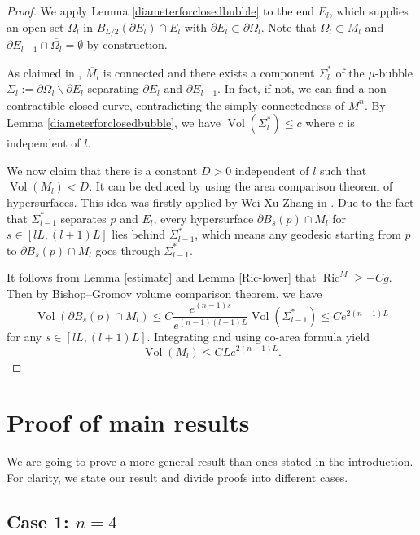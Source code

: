 \documentclass[11pt,letterpaper]{amsart}
\DeclareMathOperator{\Vol}{Vol}
\DeclareMathOperator{\Ric}{Ric}
\newtheorem{theorem}{Theorem}[section]
\theoremstyle{definition}
\theoremstyle{remark}
\numberwithin{equation}{section}
\begin{document}
\begin{proof}
We apply Lemma \ref{diameterforclosedbubble} to the end $E_l$, which supplies an open set $\Omega_l$ in $B_{L/2}(\partial E_l)\cap E_l$ with $\partial E_l\subset \partial \Omega_l$. Note that $\Omega_l\subset M_l$ and $\partial E_{l+1}\cap \overline{\Omega_l}=\emptyset$ by construction. 

As claimed in \cite[Lemma 5.4]{chodosh-li-stryker}, $\overline{M_l}$ is connected and there exists a component $\Sigma^{*}_l$ of the $\mu$-bubble $\Sigma_l:=\partial \Omega_l\backslash \partial E_l$ separating $\partial E_l$ and $\partial E_{l+1}$. In fact, if not, we can find a non-contractible closed curve, contradicting the simply-connectedness of $M^n$. By Lemma \ref{diameterforclosedbubble}, we have $\Vol(\Sigma_l^{*})\leqslant c$ where $c$ is independent of $l.$

We now claim that there is a constant $D>0$ independent of $l$ such that $\Vol(M_l)<D$. It can be deduced by using the area comparison theorem of hypersurfaces.  This idea was firstly applied by Wei-Xu-Zhang in \cite{Wei_Xu_Zhang}. Due to the fact that $\Sigma_{l-1}^{*}$ separates $p$ and $E_l$, every hypersurface $\partial B_s(p)\cap M_l$ for $s\in [lL,(l+1)L]$ lies behind $\Sigma_{l-1}^{*}$, which means any geodesic starting from $p$ to $\partial B_s(p)\cap M_l$ goes through $\Sigma_{l-1}^{*}$. 

It follows from Lemma \ref{estimate} and Lemma \ref{Ric-lower} that $\Ric^M\geq -Cg$. Then by Bishop--Gromov volume comparison theorem, we have
    \[\Vol(\partial B_s(p)\cap M_l)\leq C\frac{e^{(n-1)s}}{e^{(n-1)(l-1)L}}\Vol(\Sigma_{l-1}^{*})\leq Ce^{2(n-1)L}\]
    for any $s\in [lL,(l+1)L]$. Integrating and using co-area formula yield
    \[\Vol(M_l)\leq CLe^{2(n-1)L}.\]
\end{proof}

\section{Proof of main results}\label{proof-of-main-results}
We are going to prove a more general result than ones stated in the introduction. For clarity, we state our result and divide proofs into different cases.

\subsection{Case 1: $n=4$}
\end{document}
